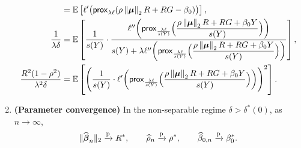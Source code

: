 \begin{thm}
\begin{enumerate}[label=(\alph*)]
\begin{align*}
            & = 
            \mathbb{E} \left[ \ell'\bigl( \mathsf{prox}_{ \lambda \ell}( \rho\left\|{{\boldsymbol{\mu}}}\right\|_2 R + RG - \beta_0 ) \bigr) \right] ,
            \\
            \frac{1}{\lambda \delta }
            & = 
            \mathbb{E} \left[ \dfrac{1}{s(Y)} \cdot \frac{
            \ell'' \biggl( \mathsf{prox}_{\frac{\lambda \ell}{s(Y)}}\Bigl( \dfrac{\rho\left\|{{\boldsymbol{\mu}}}\right\|_2 R + RG + \beta_0 Y}{s(Y)} \Bigr) \biggr)
            }{s(Y) + 
            \lambda \ell'' \biggl( \mathsf{prox}_{\frac{\lambda \ell}{s(Y)}}\Bigl( \dfrac{\rho\left\|{{\boldsymbol{\mu}}}\right\|_2 R + RG + \beta_0 Y}{s(Y)} \Bigr) \biggr)
            } \right] ,
            \\
            \frac{R^2 (1 - \rho^2)}{\lambda^2 \delta}
            & = 
            \mathbb{E} \left[ \Biggl(  
            \frac{1}{s(Y)} \cdot \ell' \biggl( \mathsf{prox}_{\frac{\lambda \ell}{s(Y)}}\Bigl( \frac{\rho\left\|{{\boldsymbol{\mu}}}\right\|_2 R + RG + \beta_0 Y}{s(Y)} \Bigr) \biggr)
            \Biggr)^2 \right].
        \end{align*}

        \item \label{thm:logistic_main(b)}
        \textbf{(Parameter convergence)} In the non-separable regime $\delta > \delta^*(0)$, as $n \to \infty$,
        \begin{equation*}
            \| \widehat{{\boldsymbol{\beta}}}_n \|_2 \xrightarrow{\mathrm{p}} R^*,
            \qquad
            \widehat\rho_n \xrightarrow{\mathrm{p}} \rho^*,
            \qquad
            \widehat\beta_{0,n} \xrightarrow{\mathrm{p}} \beta_0^*.
        \end{equation*}


\end{enumerate}
\end{thm}
